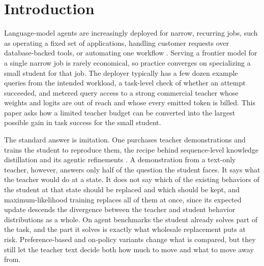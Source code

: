 \section{Introduction}

Language-model agents are increasingly deployed for narrow, recurring
jobs, such as operating a fixed set of applications, handling customer
requests over database-backed tools, or automating one workflow
\citep{yao2023react, trivedi2024appworld, yao2024taubench,
shridhar2021alfworld}. Serving a frontier model for a single narrow
job is rarely economical, so practice converges on specializing a
small student for that job. The deployer typically has a few dozen
example queries from the intended workload, a task-level check of
whether an attempt succeeded, and metered query access to a strong
commercial teacher whose weights and logits are out of reach and whose
every emitted token is billed. This paper asks how a limited teacher
budget can be converted into the largest possible gain in task success
for the small student.

The standard answer is imitation. One purchases teacher demonstrations
and trains the student to reproduce them, the recipe behind
sequence-level knowledge distillation and its agentic refinements
\citep{kim2016sequence, mukherjee2023orca, liu2025structured,
kang2025distilling}. A demonstration from a text-only teacher,
however, answers only half of the question the student faces. It says
what the teacher would do at a state. It does not say which of the
existing behaviors of the student at that state should be replaced and
which should be kept, and maximum-likelihood training replaces all of
them at once, since its expected update descends the divergence between
the teacher and student behavior distributions as a whole. On agent
benchmarks the student already solves part of the task, and the part
it solves is exactly what wholesale replacement puts at risk.
Preference-based and on-policy variants change what is compared, but
they still let the teacher text decide both how much to move and what
to move away from.

